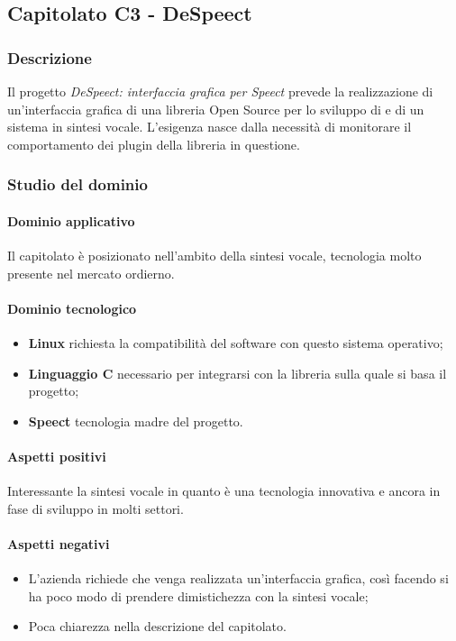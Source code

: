 	
	\subsection{Capitolato C3 - DeSpeect}
	\subsubsection{Descrizione}	
		Il progetto \emph{DeSpeect: interfaccia grafica per Speect} prevede la realizzazione di un'interfaccia grafica di una libreria Open Source per lo sviluppo di  e  di un sistema in sintesi vocale.
		L'esigenza nasce dalla necessità di monitorare il comportamento dei plugin della libreria in questione.
	\subsubsection{Studio del dominio}
	
	\paragraph{Dominio applicativo} \Spazio
     Il capitolato è posizionato nell'ambito della sintesi vocale, tecnologia molto presente nel mercato ordierno. 
	\paragraph{Dominio tecnologico}
	\begin{itemize}
		\item \textbf{Linux} richiesta la compatibilità del software con questo sistema operativo;
		\item  \textbf{Linguaggio C} necessario per integrarsi con la libreria sulla quale si basa il progetto;
		\item  \textbf{Speect} tecnologia madre del progetto.
	\end{itemize}
	\paragraph{Aspetti positivi} \Spazio
	Interessante la sintesi vocale in quanto è una tecnologia innovativa e ancora in fase di sviluppo in molti settori.
	\paragraph{Aspetti negativi} \Spazio 
	\begin{itemize}
		\item L'azienda richiede che venga realizzata un'interfaccia grafica, così facendo si ha poco modo di prendere dimistichezza con la sintesi vocale;
		\item Poca chiarezza nella descrizione del capitolato.
	\end{itemize}

